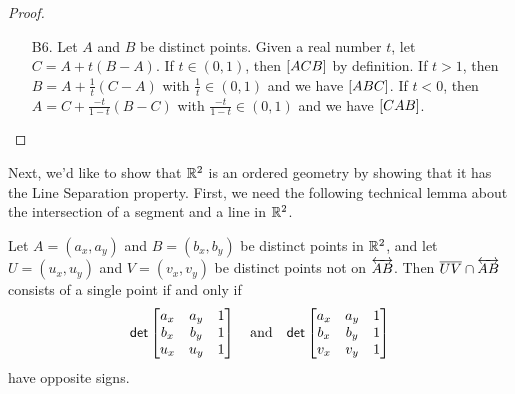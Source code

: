 \begin{proof}
\begin{itemize}
\item[B6.] Let \(A\) and \(B\) be distinct points.
Given a real number \(t\), let \(C = A + t(B-A)\).
If \(t \in (0,1)\), then \([ A C B ]\) by definition.
If \(t > 1\), then \(B = A + \frac{1}{t}(C-A)\) with \(\frac{1}{t} \in (0,1)\) and we have \([ A B C ]\).
If \(t < 0\), then \(A = C + \frac{-t}{1-t}(B-C)\) with \(\frac{-t}{1-t} \in (0,1)\) and we have \([ C A B ]\).
\qedhere
\end{itemize}
\end{proof}

Next, we'd like to show that \(\mathbb{R}^2\) is an ordered geometry by showing that it has the Line Separation property.
First, we need the following technical lemma about the intersection of a segment and a line in \(\mathbb{R}^2\).

\begin{lem}\label{lem:rr2-opp-side-incidence}
Let \(A = (a_x,a_y)\) and \(B = (b_x,b_y)\) be distinct points in \(\mathbb{R}^2\), and let \(U = (u_x, u_y)\) and \(V = (v_x, v_y)\) be distinct points not on \(\overleftrightarrow{AB}\).
Then \(\overline{UV} \cap \overleftrightarrow{AB}\) consists of a single point if and only if \[ \mathsf{det} \begin{bmatrix} a_x & a_y & 1 \\ b_x & b_y & 1 \\ u_x & u_y & 1 \end{bmatrix} \quad \mathrm{and} \quad \mathsf{det} \begin{bmatrix} a_x & a_y & 1 \\ b_x & b_y & 1 \\ v_x & v_y & 1 \end{bmatrix} \] have opposite signs.
\end{lem}

